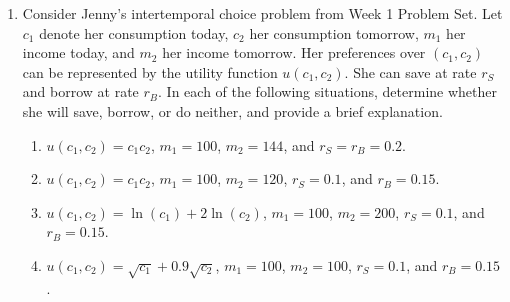\documentclass[11pt]{article}
\begin{document}
\begin{enumerate}
\item Consider Jenny's intertemporal choice problem from Week 1 Problem Set. Let $c_{1}$ denote her consumption today, $c_{2}$ her consumption tomorrow, $m_{1}$ her income today, and $m_{2}$ her income tomorrow. Her preferences over $(c_{1},c_{2})$ can be represented by the utility function $u(c_{1},c_{2})$. She can save at rate $r_{S}$ and borrow at rate $r_{B}$. In each of the following situations, determine whether she will save, borrow, or do neither, and provide a brief explanation.

    \begin{enumerate}
        \item $u(c_{1},c_{2})=c_{1}c_{2}$, $m_{1}=100$, $m_{2}=144$, and $r_{S}=r_{B}=0.2$.

        \item $u(c_{1},c_{2})=c_{1}c_{2}$, $m_{1}=100$, $m_{2}=120$, $r_{S}=0.1$, and $r_{B}=0.15$.

        \item $u(c_{1},c_{2})=\ln(c_{1})+2\ln(c_{2})$, $m_{1}=100$, $m_{2}=200$, $r_{S}=0.1$, and $r_{B}=0.15$.

        \item $u(c_{1},c_{2})=\sqrt{c_{1}}+0.9\sqrt{c_{2}}$, $m_{1}=100$, $m_{2}=100$, $r_{S}=0.1$, and $r_{B}=0.15$.
    \end{enumerate}




\end{enumerate}
\end{document}
